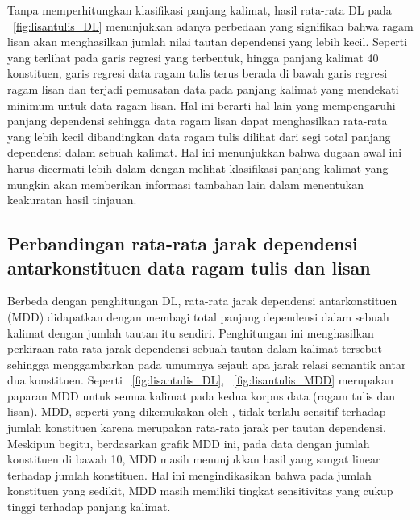 Tanpa memperhitungkan klasifikasi panjang kalimat, hasil rata-rata DL pada \pic~\ref{fig:lisantulis_DL} menunjukkan adanya perbedaan yang signifikan bahwa ragam lisan akan menghasilkan jumlah nilai tautan dependensi yang lebih kecil. Seperti yang terlihat pada garis regresi yang terbentuk, hingga panjang kalimat 40 konstituen, garis regresi data ragam tulis terus berada di bawah garis regresi ragam lisan dan terjadi pemusatan data pada panjang kalimat yang mendekati minimum untuk data ragam lisan. Hal ini berarti hal lain yang mempengaruhi panjang dependensi sehingga data ragam lisan dapat menghasilkan rata-rata yang lebih kecil dibandingkan data ragam tulis dilihat dari segi total panjang dependensi dalam sebuah kalimat. Hal ini menunjukkan bahwa dugaan awal ini harus dicermati lebih dalam dengan melihat klasifikasi panjang kalimat yang mungkin akan memberikan informasi tambahan lain dalam menentukan keakuratan hasil tinjauan. 

\subsection{Perbandingan rata-rata jarak dependensi antarkonstituen data ragam tulis dan lisan}

Berbeda dengan penghitungan DL, rata-rata jarak dependensi antarkonstituen (MDD) didapatkan dengan membagi total panjang dependensi dalam sebuah kalimat dengan jumlah tautan itu sendiri. Penghitungan ini menghasilkan perkiraan rata-rata jarak dependensi sebuah tautan dalam kalimat tersebut sehingga menggambarkan pada umumnya sejauh apa jarak relasi semantik antar dua konstituen. Seperti \pic~\ref{fig:lisantulis_DL}, \pic~\ref{fig:lisantulis_MDD} merupakan paparan MDD untuk semua kalimat pada kedua korpus data (ragam tulis dan lisan). MDD, seperti yang dikemukakan oleh \citet[p. 4]{liu2017dependency}, tidak terlalu sensitif terhadap jumlah konstituen karena merupakan rata-rata jarak per tautan dependensi. Meskipun begitu, berdasarkan grafik MDD ini, pada data dengan jumlah konstituen di bawah 10, MDD masih menunjukkan hasil yang sangat linear terhadap jumlah konstituen. Hal ini mengindikasikan bahwa pada jumlah konstituen yang sedikit, MDD masih memiliki tingkat sensitivitas yang cukup tinggi terhadap panjang kalimat.

